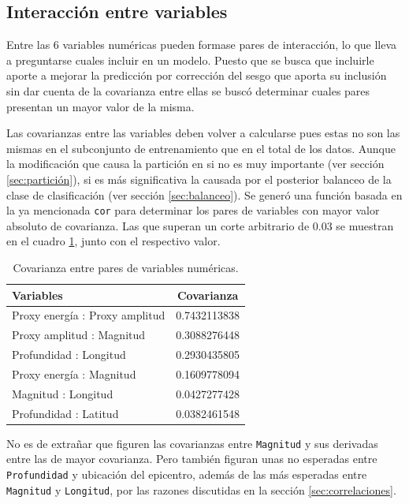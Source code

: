 \documentclass[a4paper]{report}
\begin{document}
\subsection{Interacción entre variables}\label{sec:logística_con_interacción}
Entre las 6 variables numéricas pueden formase pares de interacción, lo que lleva a preguntarse cuales incluir en un modelo.
Puesto que se busca que incluirle aporte a mejorar la predicción por corrección del sesgo que aporta su inclusión sin dar cuenta de la covarianza entre ellas se buscó determinar cuales pares presentan un mayor valor de la misma.

Las covarianzas entre las variables deben volver a calcularse pues estas no son las mismas en el subconjunto de entrenamiento que en el total de los datos.
Aunque la modificación que causa la partición en si no es muy importante (ver sección \ref{sec:partición}), si es más significativa la causada por el posterior balanceo de la clase de clasificación (ver sección \ref{sec:balanceo}).
Se generó una función basada en la ya mencionada \lstinline[language=R]{cor} para determinar los pares de variables con mayor valor absoluto de covarianza.
Las que superan un corte arbitrario de \num{0.03} se muestran en el cuadro \ref{tab:covarianza}, junto con el respectivo valor.

\begin{table}[!ht]
	\centering
	\begin{tabular}{lc}
		\toprule
		Variables & Covarianza\\
		\midrule
		Proxy energía : Proxy amplitud & 0.7432113838\\
		Proxy amplitud : Magnitud & 0.3088276448\\
		Profundidad : Longitud & 0.2930435805\\
		Proxy energía : Magnitud & 0.1609778094\\
		Magnitud : Longitud & 0.0427277428\\
		Profundidad : Latitud & 0.0382461548\\
		\bottomrule
	\end{tabular}
	\caption{Covarianza entre pares de variables numéricas.}
	\label{tab:covarianza}
\end{table}
No es de extrañar que figuren las covarianzas entre \verb'Magnitud' y sus derivadas entre las de mayor covarianza.
Pero también figuran unas no esperadas entre \verb'Profundidad' y ubicación del epicentro, además de las más esperadas entre \verb'Magnitud' y \verb'Longitud', por las razones discutidas en la sección \ref{sec:correlaciones}.
\end{document}

